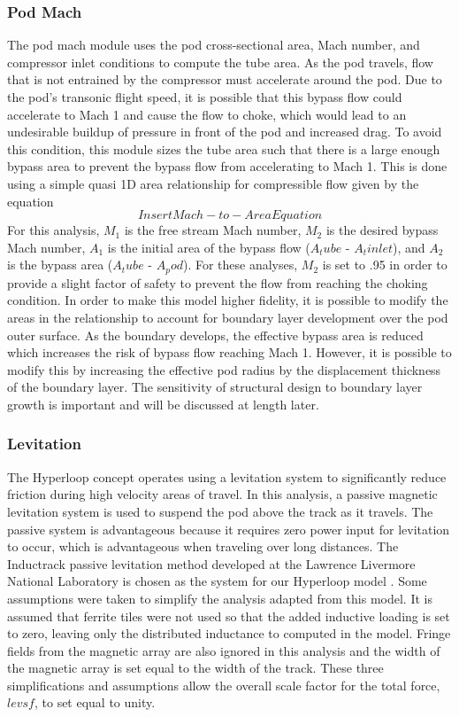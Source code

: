\subsubsection{Pod Mach}
	The pod mach module uses the pod cross-sectional area, Mach number, and compressor inlet conditions to compute the tube area. As the pod travels, flow that is not entrained by the compressor must accelerate around the pod. Due to the pod’s transonic flight speed, it is possible that this bypass flow could accelerate to Mach 1 and cause the flow to choke, which would lead to an undesirable buildup of pressure in front of the pod and increased drag. To avoid this condition, this module sizes the tube area such that there is a large enough bypass area to prevent the bypass flow from accelerating to Mach 1. This is done using a simple quasi 1D area relationship for compressible flow given by the equation
	\begin{equation}
		\label{eq:mach_to_area}
		Insert Mach-to-Area Equation
	\end{equation}
	For this analysis, $M_1$ is the free stream Mach number, $M_2$ is the desired bypass Mach number, $A_1$ is the initial area of the bypass flow ($A_tube$ - $A_tinlet$), and $A_2$ is the bypass area ($A_tube$ - $A_pod$). For these analyses, $M_2$ is set to .95 in order to provide a slight factor of safety to prevent the flow from reaching the choking condition.
	In order to make this model higher fidelity, it is possible to modify the areas in the relationship to account for boundary layer development over the pod outer surface. As the boundary develops, the effective bypass area is reduced which increases the risk of bypass flow reaching Mach 1. However, it is possible to modify this by increasing the effective pod radius by the displacement thickness of the boundary layer. The sensitivity of structural design to boundary layer growth is important and will be discussed at length later.
\subsubsection{Levitation}
	The Hyperloop concept operates using a levitation system to significantly reduce friction during high velocity areas of travel. In this analysis, a passive magnetic levitation system is used to suspend the pod above the track as it travels. The passive system is advantageous because it requires zero power input for levitation to occur, which is advantageous when traveling over long distances. The Inductrack passive levitation method developed at the Lawrence Livermore National Laboratory is chosen as the system for our Hyperloop model \cite{inductrack}. Some assumptions were taken to simplify the analysis adapted from this model. It is assumed that ferrite tiles were not used so that the added inductive loading is set to zero, leaving only the distributed inductance to computed in the model. Fringe fields from the magnetic array are also ignored in this analysis and the width of the magnetic array is set equal to the width of the track. These three simplifications and assumptions allow the overall scale factor for the total force, $levsf$, to set equal to unity.

